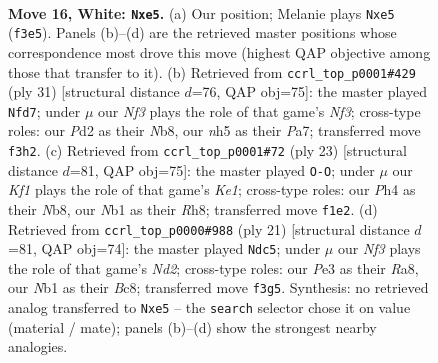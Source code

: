 \documentclass[11pt]{article}
\begin{document}
\clearpage

\begin{figure}[p]\centering
\begin{subfigure}{0.46\textwidth}\centering
\resizebox{\linewidth}{!}{%
\newchessgame
\chessboard[
  setfen={r1b2rk1/pp4bp/6p1/2pnpp1n/7P/4PNP1/PP1P1P2/RNB1RK1B w - - 0 16},
  showmover=false,
  pgfstyle=straightmove, color=movearrow, markmove={f3-e5}
]}
\caption{}
\end{subfigure}\hfill
\begin{subfigure}{0.46\textwidth}\centering
\resizebox{\linewidth}{!}{%
\newchessgame
\chessboard[
  setfen={rn3rk1/p4ppp/b1pPpn2/4N3/Ppp1P3/6P1/1P3PBP/R1B1R1K1 b - - 0 16},
  showmover=false,
  pgfstyle=straightmove, color=movearrow, markmove={f6-d7}
]}
\caption{}
\end{subfigure}
\\[4pt]
\begin{subfigure}{0.46\textwidth}\centering
\resizebox{\linewidth}{!}{%
\newchessgame
\chessboard[
  setfen={1n2k2r/rp2bppp/p1p1pnb1/8/3NP3/2NP4/PP2BPPP/R1B2RK1 b k - 0 12},
  showmover=false,
  pgfstyle=straightmove, color=movearrow, markmove={e8-g8}
]}
\caption{}
\end{subfigure}\hfill
\begin{subfigure}{0.46\textwidth}\centering
\resizebox{\linewidth}{!}{%
\newchessgame
\chessboard[
  setfen={r1b1k2r/p1pnp1bp/np4p1/1N2Pp2/2P2P2/5N2/PP4PP/R1BK1B1R b kq - 3 11},
  showmover=false,
  pgfstyle=straightmove, color=movearrow, markmove={d7-c5}
]}
\caption{}
\end{subfigure}
\caption{\textbf{Move 16, White: \texttt{Nxe5}.} (a) Our position; Melanie plays \texttt{Nxe5} (\texttt{f3e5}). Panels (b)--(d) are the retrieved master positions whose correspondence most drove this move (highest QAP objective among those that transfer to it). (b) Retrieved from \texttt{ccrl\_top\_p0001\#429} (ply 31) [structural distance $d$=76, QAP obj=75]: the master played \texttt{Nfd7}; under $\mu$ our \emph{Nf3} plays the role of that game's \emph{Nf3}; cross-type roles: our \emph{P}d2 as their \emph{N}b8, our \emph{n}h5 as their \emph{P}a7; transferred move \texttt{f3h2}. (c) Retrieved from \texttt{ccrl\_top\_p0001\#72} (ply 23) [structural distance $d$=81, QAP obj=75]: the master played \texttt{O-O}; under $\mu$ our \emph{Kf1} plays the role of that game's \emph{Ke1}; cross-type roles: our \emph{P}h4 as their \emph{N}b8, our \emph{N}b1 as their \emph{R}h8; transferred move \texttt{f1e2}. (d) Retrieved from \texttt{ccrl\_top\_p0000\#988} (ply 21) [structural distance $d$=81, QAP obj=74]: the master played \texttt{Ndc5}; under $\mu$ our \emph{Nf3} plays the role of that game's \emph{Nd2}; cross-type roles: our \emph{P}e3 as their \emph{R}a8, our \emph{N}b1 as their \emph{B}c8; transferred move \texttt{f3g5}. Synthesis: no retrieved analog transferred to \texttt{Nxe5} -- the \texttt{search} selector chose it on value (material / mate); panels (b)--(d) show the strongest nearby analogies.}
\label{fig:thought-m30}
\end{figure}
\end{document}
